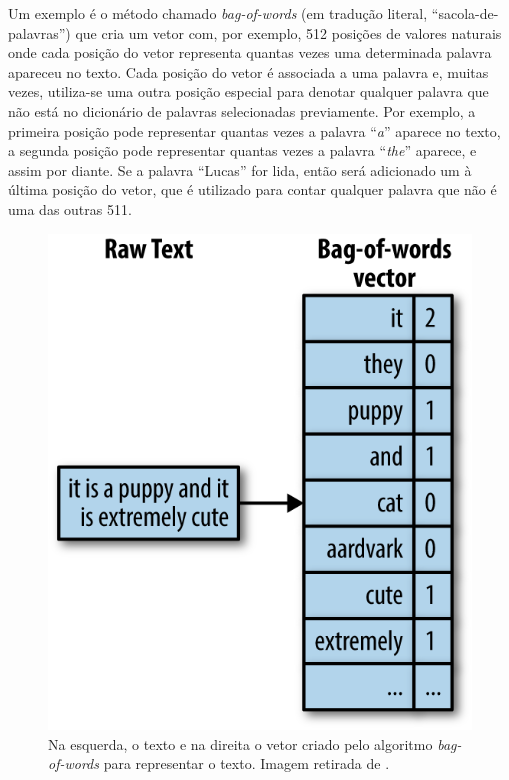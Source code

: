 Um exemplo é o método chamado \textit{bag-of-words} (em tradução literal,
``sacola-de-palavras'') que cria um vetor com, por exemplo, 512 posições de
valores naturais onde cada posição do vetor representa quantas vezes uma
determinada palavra  apareceu no texto. Cada posição do vetor é associada a uma
palavra e, muitas vezes, utiliza-se uma outra posição especial para denotar
qualquer palavra que não está no dicionário de palavras selecionadas
previamente. Por exemplo, a primeira posição pode representar quantas vezes a
palavra ``\textit{a}'' aparece no texto, a segunda posição pode representar
quantas vezes a palavra ``\textit{the}'' aparece, e assim por diante. Se a
palavra ``Lucas'' for lida, então será adicionado um à última posição do vetor,
que é utilizado para contar qualquer palavra que não é uma das outras 511.

\begin{figure}[h]
\centering
\includegraphics[scale=1.3]{Res/bow-image.png}
\caption{Na esquerda, o texto e na direita o vetor criado pelo algoritmo
\textit{bag-of-words} para representar o texto. Imagem retirada de
\cite{zheng-casari:2018:feature-engineering}.}
\label{bow-image.png}
\end{figure}



